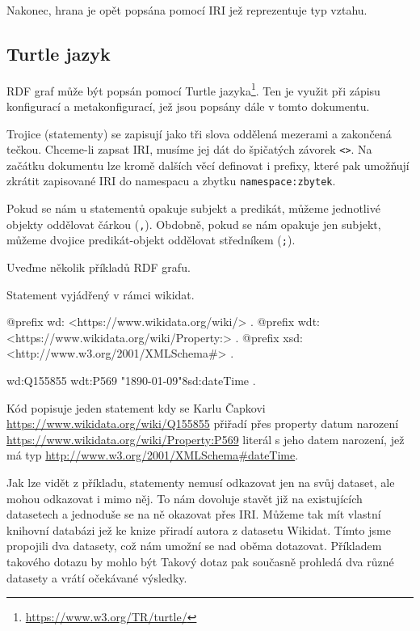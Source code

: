 Nakonec, hrana je opět popsána pomocí IRI jež reprezentuje typ vztahu.

\subsection{Turtle jazyk}
RDF graf může být popsán pomocí Turtle jazyka\footnote{\url{https://www.w3.org/TR/turtle/}}. Ten je využit při zápisu konfigurací a metakonfigurací, jež jsou popsány dále v tomto dokumentu.

Trojice (statementy) se zapisují jako tři slova oddělená mezerami a zakončená tečkou. Chceme-li zapsat IRI, musíme jej dát do špičatých závorek \texttt{<>}. Na začátku dokumentu lze kromě dalších věcí definovat i prefixy, které pak umožňují zkrátit zapisované IRI do namespacu a zbytku \texttt{namespace:zbytek}.

Pokud se nám u statementů opakuje subjekt a predikát, můžeme jednotlivé objekty oddělovat čárkou (\texttt{,}). Obdobně, pokud se nám opakuje jen subjekt, můžeme dvojice predikát-objekt oddělovat středníkem (\texttt{;}).

Uveďme několik příkladů RDF grafu.

\begin{prikl}
Statement  vyjádřený v rámci wikidat.
\begin{code}
@prefix wd: <https://www.wikidata.org/wiki/> .
@prefix wdt: <https://www.wikidata.org/wiki/Property:> .
@prefix xsd: <http://www.w3.org/2001/XMLSchema#> .

wd:Q155855 wdt:P569 "1890-01-09"^^xsd:dateTime .
\end{code}

Kód popisuje jeden statement kdy se Karlu Čapkovi \\ \url{https://www.wikidata.org/wiki/Q155855} přiřadí přes property datum narození \url{https://www.wikidata.org/wiki/Property:P569} literál s jeho datem narození, jež má typ \url{http://www.w3.org/2001/XMLSchema#dateTime}.
\end{prikl}

Jak lze vidět z příkladu, statementy nemusí odkazovat jen na svůj dataset, ale mohou odkazovat i mimo něj. To nám dovoluje stavět již na existujících datasetech a jednoduše se na ně okazovat přes IRI. Můžeme tak mít vlastní knihovní databázi jež ke knize přiradí autora z datasetu Wikidat. Tímto jsme propojili dva datasety, což nám umožní se nad oběma dotazovat. Příkladem takového dotazu by mohlo být  Takový dotaz pak současně prohledá dva různé datasety a vrátí očekávané výsledky.

